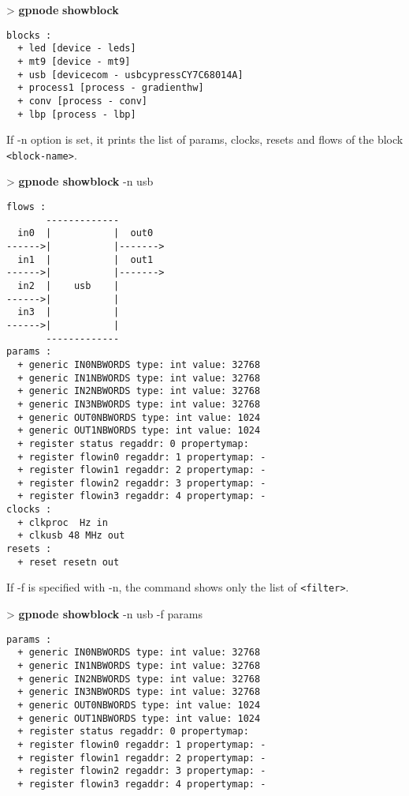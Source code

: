 \documentclass[10pt,a4paper]{article}
\begin{document}
\begin{sampletitle}
> \textbf{gpnode} \textbf{showblock}
\begin{Verbatim}
blocks :
  + led [device - leds]
  + mt9 [device - mt9]
  + usb [devicecom - usbcypressCY7C68014A]
  + process1 [process - gradienthw]
  + conv [process - conv]
  + lbp [process - lbp]
\end{Verbatim}
\end{sampletitle}

If -n option is set, it prints the list of params, clocks, resets and flows of the block \texttt{<block-name>}.

\begin{sampletitle}
> \textbf{gpnode showblock} -n usb
\begin{Verbatim}
flows :
       -------------        
  in0  |           |  out0  
------>|           |------->
  in1  |           |  out1  
------>|           |------->
  in2  |    usb    |        
------>|           |        
  in3  |           |        
------>|           |        
       -------------
params :
  + generic IN0NBWORDS type: int value: 32768
  + generic IN1NBWORDS type: int value: 32768
  + generic IN2NBWORDS type: int value: 32768
  + generic IN3NBWORDS type: int value: 32768
  + generic OUT0NBWORDS type: int value: 1024
  + generic OUT1NBWORDS type: int value: 1024
  + register status regaddr: 0 propertymap: 
  + register flowin0 regaddr: 1 propertymap: -
  + register flowin1 regaddr: 2 propertymap: -
  + register flowin2 regaddr: 3 propertymap: -
  + register flowin3 regaddr: 4 propertymap: -
clocks :
  + clkproc  Hz in
  + clkusb 48 MHz out
resets :
  + reset resetn out
\end{Verbatim}
\end{sampletitle}

If -f is specified with -n, the command shows only the list of \texttt{<filter>}.

\begin{sampletitle}
> \textbf{gpnode showblock} -n usb -f params
\begin{Verbatim}
params :
  + generic IN0NBWORDS type: int value: 32768
  + generic IN1NBWORDS type: int value: 32768
  + generic IN2NBWORDS type: int value: 32768
  + generic IN3NBWORDS type: int value: 32768
  + generic OUT0NBWORDS type: int value: 1024
  + generic OUT1NBWORDS type: int value: 1024
  + register status regaddr: 0 propertymap: 
  + register flowin0 regaddr: 1 propertymap: -
  + register flowin1 regaddr: 2 propertymap: -
  + register flowin2 regaddr: 3 propertymap: -
  + register flowin3 regaddr: 4 propertymap: -
\end{Verbatim}
\end{sampletitle}
\end{document}
